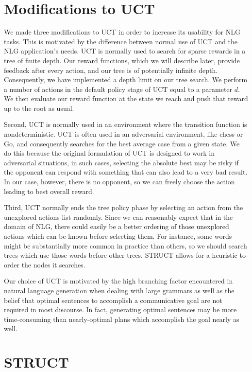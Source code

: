 \section{Modifications to UCT}

We made three modifications to UCT in order to increase its usability
for NLG tasks.  This is motivated by the difference between normal
use of UCT and the NLG application's needs.
UCT is normally used to search for sparse rewards
in a tree of finite depth.  Our reward functions, which we will describe
later, provide feedback after every action, and our tree is of potentially
infinite depth.  Consequently, we have implemented a depth limit
on our tree search.  We perform a number of actions in the
default policy stage of UCT equal to a parameter $d$.  We then
evaluate our reward function at the state we reach and push that
reward up to the root as usual.

Second, UCT is normally used in an environment where the transition
function is nondeterministic.  UCT is often used in an adversarial environment,
like chess or Go, and consequently searches for the best average case
from a given state.  We do this because the original formulation
of UCT is designed to work in adversarial situations, in such cases,
selecting the absolute best may be risky if the opponent can respond
with something that can also lead to a very bad result. In our case,
however, there is no opponent, so we can freely choose the action
leading to best overall reward.

Third, UCT normally ends the tree policy phase by selecting an action
from the unexplored actions list randomly.  Since we can reasonably
expect that in the domain of NLG, there could easily be a better ordering
of those unexplored actions which can be known before selecting them.
For instance, some words might be substantially more common in
practice than others, so we should search trees which use those
words before other trees.  STRUCT allows for a heuristic to order the nodes
it searches.

Our choice of UCT is motivated by the high branching factor encountered in natural language generation when dealing with
large grammars as well as the belief that optimal sentences to accomplish a communicative goal are not required in most
discourse. In fact, generating optimal sentences may be more time-consuming than nearly-optimal plans which accomplish
the goal nearly as well.

\section{STRUCT}
